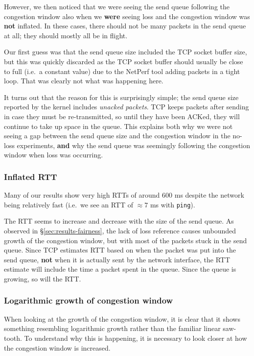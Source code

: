 However, we then noticed that we were seeing the send queue following the
congestion window also when we \textbf{were} seeing loss and the congestion
window was \textbf{not} inflated. In these cases, there should not be many
packets in the send queue at all; they should mostly all be in flight.

Our first guess was that the send queue size included the TCP socket buffer
size, but this was quickly discarded as the TCP socket buffer should usually be
close to full (i.e.\ a constant value) due to the NetPerf tool adding packets in
a tight loop. That was clearly not what was happening here.

It turns out that the reason for this is surprisingly simple; the send queue
size reported by the kernel includes \textit{unacked packets}. TCP keeps packets
after sending in case they must be re-transmitted, so until they have been
ACKed, they will continue to take up space in the queue. This explains both why
we were not seeing a gap between the send queue size and the congestion window
in the no-loss experiments, \textbf{and} why the send queue was seemingly
following the congestion window when loss was occurring.

\subsubsection{Inflated RTT}
Many of our results show very high RTTs of around 600 ms despite the network
being relatively fast (i.e.\ we see an RTT of $\approx 7$ ms with
\texttt{ping}). 

The RTT seems to increase and decrease with the size of the send queue. As 
observed in \S\ref{sec:results-fairness}, the lack of loss reference causes 
unbounded growth of the congestion window, but with most of the packets stuck in 
the send queue. Since TCP estimates RTT based on when the packet was put into 
the send queue, \textbf{not} when it is actually sent by the network interface, 
the RTT estimate will include the time a packet spent in the queue. Since the 
queue is growing, so will the RTT.

\subsubsection{Logarithmic growth of congestion window}


When looking at the growth of the congestion window, it is clear that it shows
something resembling logarithmic growth rather than the familiar linear
saw-tooth. To understand why this is happening, it is necessary to look closer
at how the congestion window is increased.


